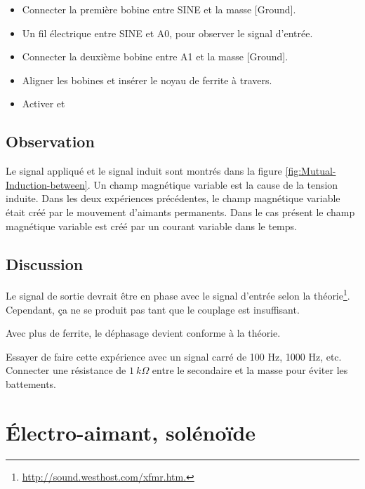 \documentclass{book}
\begin{document}
\begin{itemize}
  \item Connecter la première bobine entre SINE et la masse [Ground].
  \item Un fil électrique entre SINE et A0, pour observer le signal d'entrée.
  \item Connecter la deuxième bobine entre A1 et la masse [Ground].
  \item Aligner les bobines et insérer le noyau de ferrite à travers.
  \item Activer   et  
\end{itemize}

\subsection{Observation}


Le signal appliqué et le signal induit sont montrés dans la figure  \ref{fig:Mutual-Induction-between}. Un champ magnétique variable est la cause de la tension induite. Dans les deux expériences précédentes, le champ magnétique variable était créé par le mouvement d'aimants permanents. Dans le cas présent le champ magnétique variable est créé par un courant variable dans le temps.

\subsection{Discussion}


Le signal de sortie devrait être en phase avec le signal d'entrée selon la théorie\footnote{\href{http://sound.westhost.com/xfmr.htm}{\mbox{http://sound.westhost.com/xfmr.htm}.} }. Cependant, ça ne se produit pas tant que le couplage est insuffisant.



Avec plus de ferrite, le déphasage devient conforme à la théorie.



Essayer de faire cette expérience avec un signal carré de 100 Hz, 1000 Hz, etc. Connecter une résistance de $1\ k\Omega$  entre le secondaire et la masse pour éviter les battements.










\section{Électro-aimant, solénoïde}
\end{document}
